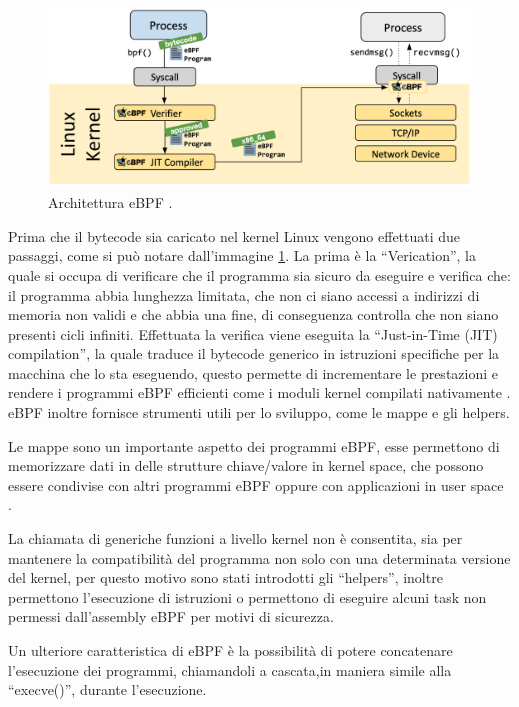 \begin{figure}[]
    \label{fig:ebpf}
    \includegraphics[width=\hsize]{images/mitigazione/ebpf_architecture.png}
    \caption{Architettura eBPF \cite{ebpf.io}.}
    \centering
\end{figure}

Prima che il bytecode sia caricato nel kernel Linux vengono effettuati due passaggi, come si può notare dall'immagine \ref{fig:ebpf}. La prima è la ``Verication'', la quale si occupa di verificare che il programma sia sicuro da eseguire e verifica che: il programma abbia lunghezza limitata, che non ci siano accessi a indirizzi di memoria non validi e che abbia una fine, di conseguenza controlla che non siano presenti cicli infiniti. 
Effettuata la verifica viene eseguita la ``Just-in-Time (JIT) compilation'', la quale traduce il bytecode generico in istruzioni specifiche per la macchina che lo sta eseguendo, questo permette di incrementare le prestazioni e rendere i programmi eBPF efficienti come i moduli kernel compilati nativamente \cite{ebpf.io}.
eBPF inoltre fornisce strumenti utili per lo sviluppo, come le mappe e gli helpers.

Le mappe sono un importante aspetto dei programmi eBPF, esse permettono di memorizzare dati in delle strutture chiave/valore in kernel space, che possono essere condivise con altri programmi eBPF oppure con applicazioni in user space \cite{cilium_ebpf}.

La chiamata di generiche funzioni a livello kernel non è consentita, sia per mantenere la compatibilità del programma non solo con una determinata versione del kernel, per questo motivo sono stati introdotti gli ``helpers'', inoltre permettono l'esecuzione di istruzioni o permettono di eseguire alcuni task non permessi dall'assembly eBPF per motivi di sicurezza.

Un ulteriore caratteristica di eBPF è la possibilità di potere concatenare l'esecuzione dei programmi, chiamandoli a cascata,in maniera simile alla ``execve()'', durante l'esecuzione.

